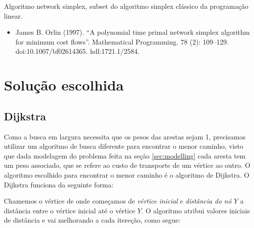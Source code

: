 \documentclass[12pt, a4]{article}
\begin{document}
Algoritmo network simplex, subset do algoritmo simplex clássico da programação
linear.

\begin{itemize}
\item James B. Orlin (1997). ``A polynomial time primal network simplex
  algorithm for minimum cost flows''. Mathematical Programming. 78 (2): 109–129.
  doi:10.1007/bf02614365. hdl:1721.1/2584.
\end{itemize}

\section{Solução escolhida}
\label{sec:solution}

\subsection{Dijkstra}
\label{subsec:dijkstra}

Como a busca em largura necessita que os pesos das arestas sejam 1, precisamos
utilizar um algoritmo de busca diferente para encontrar o menor caminho, visto
que dada modelagem do problema feita na seção \ref{sec:modelling} cada aresta
tem um peso associado, que se refere ao custo de transporte de um vértice ao
outro. O algoritmo escolhido para encontrar o menor caminho é o algoritmo de
Dijkstra. O Dijkstra funciona da seguinte forma:

Chamemos o vértice de onde começamos de \emph{vértice inicial} e \emph{distância
  do nó $Y$} a distância entre o vértice inicial até o vértice $Y$. O
algoritmo atribui valores iniciais de distância e vai melhorando a cada
itereção, como segue:
\end{document}
